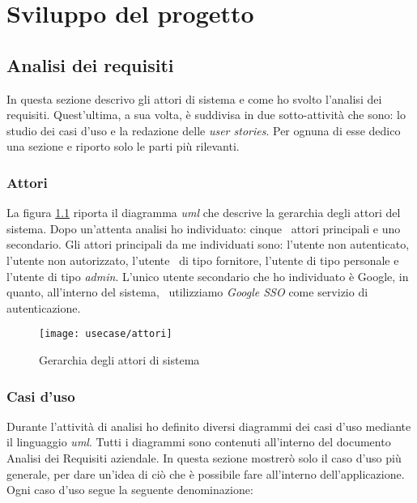 
\chapter{Sviluppo del progetto}
\label{cap:sviluppo}
\section{Analisi dei requisiti}
In questa sezione descrivo gli attori di sistema e come ho svolto l'analisi dei requisiti.
Quest'ultima, a sua volta, è suddivisa in due sotto-attività che sono: lo studio dei casi d'uso e la redazione delle \emph{user stories}.
Per ognuna di esse dedico una sezione e riporto solo le parti più rilevanti.

\subsection{Attori}
La figura \ref{fig:attori} riporta il diagramma \emph{\acrshort{uml}} che descrive la gerarchia degli attori del sistema. Dopo un'attenta analisi ho individuato: cinque \
attori principali e uno secondario. Gli attori principali da me individuati sono: l'utente non autenticato, l'utente non autorizzato, l'utente \
di tipo fornitore, l'utente di tipo personale e l'utente di tipo \emph{admin}. L'unico utente secondario che ho individuato è Google, in quanto, all'interno del sistema, \
utilizziamo \emph{Google SSO} come servizio di autenticazione. 

\begin{figure}[!ht]
  \begin{center}
    \texttt{[image: usecase/attori]}
    \caption{Gerarchia degli attori di sistema}
    \label{fig:attori}
  \end{center}
\end{figure}

\subsection{Casi d'uso}
Durante l'attività di analisi ho definito diversi diagrammi dei casi d'uso mediante il linguaggio \emph{\acrshort{uml}}.
Tutti i diagrammi sono contenuti all'interno del documento Analisi dei Requisiti aziendale. 
In questa sezione mostrerò solo il caso d'uso più generale, per dare un'idea di ciò che è possibile fare all'interno dell'applicazione. 
Ogni caso d'uso segue la seguente denominazione:

